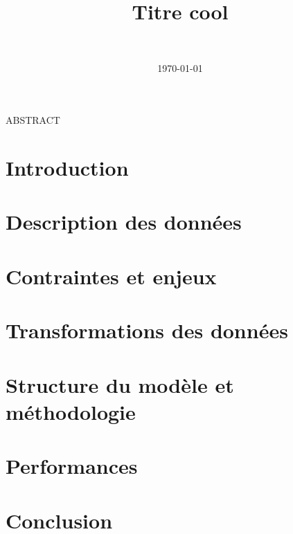 \documentclass[10pt, a4paper, twocolumn]{article} %
\title{Titre cool} %
\author{
	\authorstyle{William Bourget et Samuel Lévesque} %
	\newline\newline %
	\institution{Université Laval}\\ %
}
\date{\today} %
\begin{document}
\maketitle %

\thispagestyle{firstpage} %

ABSTRACT



\section{Introduction}



\section{Description des données}



\section{Contraintes et enjeux}


\section{Transformations des données}


\section{Structure du modèle et méthodologie}



\section{Performances}



\section{Conclusion}





\printbibliography[title={Bibliography}] %

\end{document}
